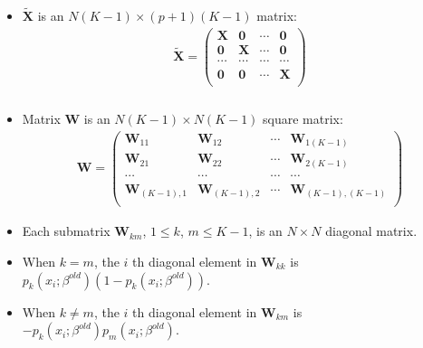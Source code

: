 \documentclass[12pt,notes,mathserif]{beamer}
\begin{document}
\begin{frame}[c]
	\frametitle{}
	\begin{itemize}
		\item $\tilde{\mathbf{X}}$ is an $N(K − 1) \times (p + 1)(K − 1)$ matrix:
		      \begin{gather*}
			      \tilde{\mathbf{X}}=
			      \begin{pmatrix}
				      \mathbf{X} & \mathbf{0} & \cdots & \mathbf{0} \\
				      \mathbf{0} & \mathbf{X} & \cdots & \mathbf{0} \\
				      \cdots     & \cdots     & \cdots & \cdots     \\
				      \mathbf{0} & \mathbf{0} & \cdots & \mathbf{X} \\
			      \end{pmatrix}
		      \end{gather*}
	\end{itemize}
\end{frame}

\begin{frame}[c]
	\frametitle{}
	\begin{itemize}
		\item Matrix $\mathbf{W}$ is an $N(K − 1) \times N(K − 1)$ square matrix:
		      \begin{gather*}
			      \mathbf{W}=
			      \begin{pmatrix}
				      \mathbf{W}_{11}      & \mathbf{W}_{12}      & \cdots & \mathbf{W}_{1(K-1)}      \\
				      \mathbf{W}_{21}      & \mathbf{W}_{22}      & \cdots & \mathbf{W}_{2(K-1)}      \\
				      \cdots               & \cdots               & \cdots & \cdots                   \\
				      \mathbf{W}_{(K-1),1} & \mathbf{W}_{(K-1),2} & \cdots & \mathbf{W}_{(K-1),(K-1)} \\
			      \end{pmatrix}
		      \end{gather*}
		\item Each submatrix $\mathbf{W}_{km}$, $1 \leqslant{} k$, $m \leqslant{} K − 1$, is an $N \times N$ diagonal matrix.

		\item  When $k = m$, the $i$ th diagonal element in $\mathbf{W}_{kk}$ is $p_k (x_i;\beta^{old})(1 − p_k (x_i;\beta^{old}))$.

		\item  When $k \neq m$, the $i$ th diagonal element in $\mathbf{W}_{km}$ is $−p_k (x_i;\beta^{old})p_m (x_i;\beta^{old})$.
	\end{itemize}
\end{frame}
\end{document}
